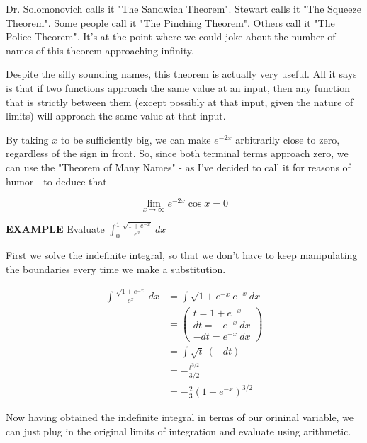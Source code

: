\documentclass{article}
\begin{document}
\vspace{10pt}

Dr. Solomonovich calls it "The Sandwich Theorem". Stewart calls it "The Squeeze Theorem". Some people call it "The Pinching Theorem". Others call it "The Police Theorem". It's at the point where we could joke about the number of names of this theorem approaching infinity.

\vspace{10pt}

Despite the silly sounding names, this theorem is actually very useful. All it says is that if two functions approach the same value at an input, then any function that is strictly between them (except possibly at that input, given the nature of limits) will approach the same value at that input.

\vspace{10pt}

By taking $x$ to be sufficiently big, we can make $e^{-2x}$ arbitrarily close to zero, regardless of the sign in front. So, since both terminal terms approach zero, we can use the "Theorem of Many Names" - as I've decided to call it for reasons of humor - to deduce that

\[\lim_{x\to\infty}e^{-2x}\cos x=0\]

\vspace{10pt}

{\bf{}EXAMPLE} Evaluate $\displaystyle\int_0^1\frac{\sqrt{1+e^{-x}}}{e^x}\ dx$

\vspace{10pt}

First we solve the indefinite integral, so that we don't have to keep manipulating the boundaries every time we make a substitution.

\begin{align*}
\int\frac{\sqrt{1+e^{-x}}}{e^x}\ dx&=\int\sqrt{1+e^{-x}}e^{-x}\ dx\\
&=\left(\begin{array}{cc}t=1+e^{-x}\\dt=-e^{-x}\ dx\\-dt=e^{-x}\ dx\end{array}\right)\\
&=\int\sqrt{t}\ (-dt)\\
&=-\frac{t^{3/2}}{3/2}\\
&=-\frac{2}{3}(1+e^{-x})^{3/2}
\end{align*}

Now having obtained the indefinite integral in terms of our orininal variable, we can just plug in the original limits of integration and evaluate using arithmetic.
\end{document}
